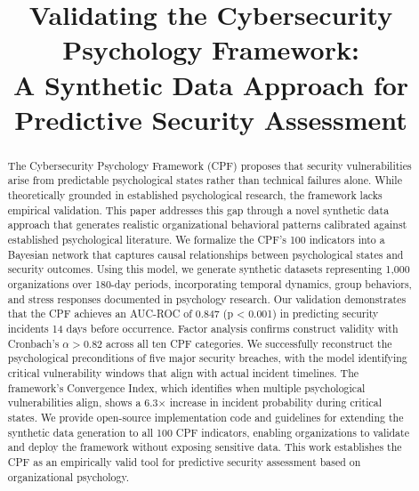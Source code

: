 \documentclass[10pt,twocolumn]{IEEEtran}
\begin{document}
\title{Validating the Cybersecurity Psychology Framework:\\
A Synthetic Data Approach for Predictive Security Assessment}

\author{
}

\maketitle

\begin{abstract}
The Cybersecurity Psychology Framework (CPF) proposes that security vulnerabilities arise from predictable psychological states rather than technical failures alone. While theoretically grounded in established psychological research, the framework lacks empirical validation. This paper addresses this gap through a novel synthetic data approach that generates realistic organizational behavioral patterns calibrated against established psychological literature. We formalize the CPF's 100 indicators into a Bayesian network that captures causal relationships between psychological states and security outcomes. Using this model, we generate synthetic datasets representing 1,000 organizations over 180-day periods, incorporating temporal dynamics, group behaviors, and stress responses documented in psychology research. Our validation demonstrates that the CPF achieves an AUC-ROC of 0.847 (p < 0.001) in predicting security incidents 14 days before occurrence. Factor analysis confirms construct validity with Cronbach's $\alpha > 0.82$ across all ten CPF categories. We successfully reconstruct the psychological preconditions of five major security breaches, with the model identifying critical vulnerability windows that align with actual incident timelines. The framework's Convergence Index, which identifies when multiple psychological vulnerabilities align, shows a 6.3× increase in incident probability during critical states. We provide open-source implementation code and guidelines for extending the synthetic data generation to all 100 CPF indicators, enabling organizations to validate and deploy the framework without exposing sensitive data. This work establishes the CPF as an empirically valid tool for predictive security assessment based on organizational psychology.
\end{abstract}
\end{document}
